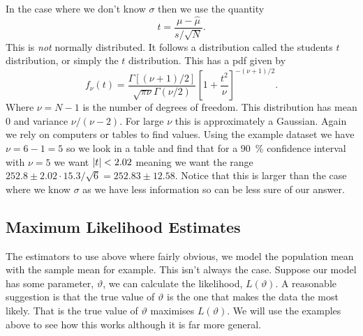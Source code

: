 \documentclass[a4paper]{article}
\begin{document}
    In the case where we don't know \(\sigma\) then we use the quantity
    \[t = \frac{\mu - \hat{\mu}}{s/\sqrt{N}}.\]
    This is \emph{not} normally distributed.
    It follows a distribution called the students \(t\) distribution, or simply the \(t\) distribution.
    This has a \gls{pdf} given by
    \[f_{\nu}(t) = \frac{\Gamma[(\nu+ 1)/2]}{\sqrt{\pi\nu}\Gamma(\nu/2)}\left[1 + \frac{t^2}{\nu}\right]^{-(\nu+1)/2}.\]
    Where \(\nu = N - 1\) is the number of degrees of freedom.
    This distribution has mean 0 and variance \(\nu/(\nu - 2)\).
    For large \(\nu\) this is approximately a Gaussian.
    Again we rely on computers or tables to find values.
    Using the example dataset we have \(\nu = 6 - 1 = 5\) so we look in a table and find that for a \SI{90}{\percent} confidence interval with \(\nu = 5\) we want \(\abs{t} < 2.02\) meaning we want the range \(252.8 \pm 2.02\cdot 15.3/\sqrt{6} = 252.83 \pm 12.58\).
    Notice that this is larger than the case where we know \(\sigma\) as we have less information so can be less sure of our answer.
    
    \subsection{Maximum Likelihood Estimates}
    The estimators to use above where fairly obvious, we model the population mean with the sample mean for example.
    This isn't always the case.
    Suppose our model has some parameter, \(\vartheta\), we can calculate the likelihood, \(L(\vartheta)\).
    A reasonable suggestion is that the true value of \(\vartheta\) is the one that makes the data the most likely.
    That is the true value of \(\vartheta\) maximises \(L(\vartheta)\).
    We will use the examples above to see how this works although it is far more general.
    
\end{document}

